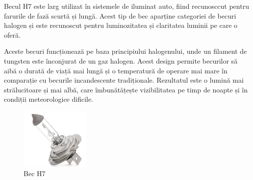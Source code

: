 Becul H7 este larg utilizat în sistemele de iluminat auto, fiind recunosccut pentru farurile de fază scurtă și lungă. Acest tip de bec aparține categoriei de becuri halogen și este recunoscut pentru luminozitatea și claritatea luminii pe care o oferă.

Aceste becuri funcționează pe baza principiului halogenului, unde un filament de tungsten este înconjurat de un gaz halogen. Acest design permite becurilor să aibă o durată de viață mai lungă și o temperatură de operare mai mare în comparație cu becurile incandescente tradiționale. Rezultatul este o lumină mai strălucitoare și mai albă, care îmbunătățește vizibilitatea pe timp de noapte și în condiții meteorologice dificile.

\begin{figure}[H]
\includegraphics[width=0.3\textwidth, height=0.3\textwidth]{images/bec_h7.png}
\caption{Bec H7\cite{bech7_poza}}
\label{fig:bec_h7}
\end{figure}


